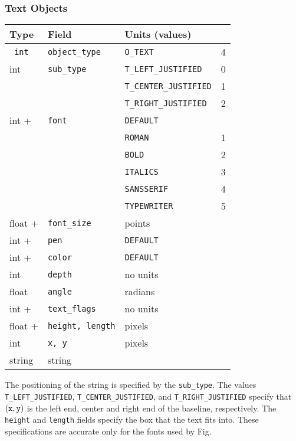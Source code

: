 \subsubsection{Text Objects}

\begin{center}
\begin{tabular}{|l|l|ll|}
\hline
Type	& Field			& Units (values)		&	\\ \hline
\hline
\tt
int	& {\tt object\_type}	& {\tt O\_TEXT}			& 4	\\ \hline
%
int	& {\tt sub\_type}	& {\tt T\_LEFT\_JUSTIFIED}	& 0	\\
	&			& {\tt T\_CENTER\_JUSTIFIED}	& 1	\\
	&			& {\tt T\_RIGHT\_JUSTIFIED}	& 2	\\
									\hline
%
int +	& {\tt font}		& {\tt DEFAULT}		&	\\
	&			& {\tt ROMAN}		& 1	\\
	&			& {\tt BOLD}		& 2	\\
	&			& {\tt ITALICS}		& 3	\\
	&			& {\tt SANSSERIF}	& 4	\\
	&			& {\tt TYPEWRITER}	& 5	\\ \hline
%
float +	& {\tt font\_size}	& points		&	\\ \hline
%
int +	& {\tt pen}		& {\tt DEFAULT}		&	\\ \hline
%
int +	& {\tt color}		& {\tt DEFAULT}		&	\\ \hline
%
int	& {\tt depth}		& no units		&	\\ \hline
%
float	& {\tt angle}		& radians		&	\\ \hline
%
int +	& {\tt text\_flags}	& no units		&	\\ \hline
%
float +	& {\tt height, length}	& pixels		&	\\ \hline
%
int	& {\tt x, y}		& pixels		&	\\ \hline
%
string	& string		&			&	\\ \hline
\end{tabular}
\end{center}
%
The positioning of the string is specified by the {\tt sub\_type}.
The values {\tt T\_LEFT\_JUSTIFIED}, {\tt T\_CENTER\_JUSTIFIED},
	and {\tt T\_RIGHT\_JUSTIFIED} specify that
	$({\tt x}, {\tt y})$ is the left end, center and right end
	 of the baseline, respectively.
The {\tt height} and {\tt length} fields specify the box that the
	text fits into.
These specifications are accurate only for the fonts used by Fig.

